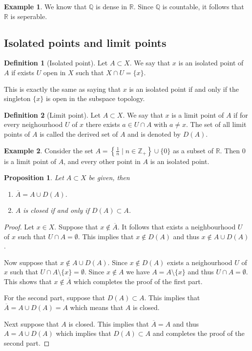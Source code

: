 \documentclass[11pt,a4paper]{article}
\theoremstyle{definition}
\newtheorem{definition}{Definition}[section]
\newtheorem{example}{Example}[section]
\theoremstyle{plain}
\newtheorem{proposition}[theorem]{Proposition}
\newcommand{\Z}{\mathbb{Z}}
\newcommand{\Q}{\mathbb{Q}}
\newcommand{\R}{\mathbb{R}}
\newcommand{\set}[2]{ \left\{ #1 \mid #2 \right\} }
\begin{document}
  \begin{example}
    We know that $\Q$ is dense in $\R$. Since $\Q$ is countable, it follows
    that $\R$ is seperable.
  \end{example}

  \subsection{Isolated points and limit points}

  \begin{definition}[Isolated point]
    Let $A \subset X$. We say that $x$ is an isolated point of $A$ if exists
    $U$ open in $X$ such that $X \cap U = \{x\}$.
  \end{definition}

  This is exactly the same as saying that $x$ is an isolated point if and
  only if the singleton $\{x\}$ is open in the subspace topology.

  \begin{definition}[Limit point]
    Let $A \subset X$. We say that $x$ is a limit point of $A$ if for every
    neighourhood $U$ of $x$ there exists $a \in U \cap A$ with $a \neq x$.
    The set of all limit points of $A$ is called the derived set of $A$
    and is denoted by $D(A)$.
  \end{definition}

  \begin{example}
    Consider the set $A = \set{\frac{1}{n}}{n \in \Z_{+}} \cup \{0\}$ as
    a subset of $\R$. Then $0$ is a limit point of $A$, and every
    other point in $A$ is an isolated point.
  \end{example}

  \begin{proposition}
    Let $A \subset X$ be given, then
    \begin{enumerate}
      \item $\overline{A} = A \cup D(A)$.
      \item $A$ is closed if and only if $D(A) \subset A$.
    \end{enumerate}
  \end{proposition}
  \begin{proof}
    Let $x \in X$. Suppose that $x \notin \overline A$. It follows that
    exists a neighbourhood $U$ of $x$ such that $U \cap A = \emptyset$.
    This implies that $x \notin D(A)$ and thus $x \notin A \cup D(A)$.

    Now suppose that $x \notin A \cup D(A)$. Since $x \notin D(A)$ exists
    a neighourhood $U$ of $x$ such that $U \cap A \setminus \{x\} = \emptyset$.
    Since $x \notin A$ we have $A = A \setminus \{x\}$ and thus
    $U \cap A = \emptyset$. This shows that $x \notin \overline A$ which
    completes the proof of the first part.

    For the second part, suppose that $D(A) \subset A$. This implies
    that $\overline A = A \cup D(A) = A$ which means that $A$ is closed.

    Next suppose that $A$ is closed. This implies that $\overline A = A$ and
    thus $A = A \cup D(A)$ which implies that $D(A) \subset A$ and completes
    the proof of the second part.
  \end{proof}
\end{document}
